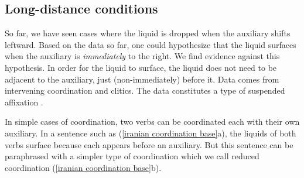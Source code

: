 \subsection{Long-distance conditions}\label{section:morphophono:auxiliary:longdistance}

So far, we have seen cases where the  liquid is dropped when the auxiliary shifts leftward. Based on the data so far, one could hypothesize  that the liquid surfaces when the auxiliary is \textit{immediately} to the right. We find evidence against this hypothesis. In order for the liquid to surface, the liquid does not need to be adjacent to the auxiliary, just  (non-immediately) before it.  Data comes from   intervening coordination and clitics.   The data constitutes a type of suspended affixation \citep{Kabak-2007-TurkishSuspendedAffixation,kornfilt-2012-revisitingSuspendedAffixationOtherCoordinateMyseries,erschler-2018-suspendedAffixationMorphemeEllipsisEvidenceOsseticAlternativeQuestions,Fenger-2020-WordsWithinWordsInternalSyntaxVerbs,Dolatian-prep-ArmenianThemeAllomorphyOutputProsodyPeriphrasis}. 


In simple cases of coordination, two verbs can be coordinated each with their own auxiliary. In a sentence such as (\ref{iranian coordination base}a), the liquids of both verbs surface because each appears before an auxiliary. 
But this sentence can be paraphrased with a simpler type of coordination which we call reduced coordination (\ref{iranian coordination base}b). 


